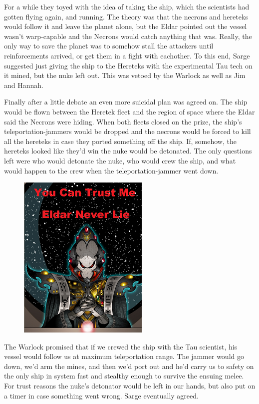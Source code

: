 For a while they toyed with the idea of taking the ship, which the scientists had gotten flying again, and running. 
The theory was that the necrons and hereteks would follow it and leave the planet alone, but the Eldar pointed out the vessel wasn't warp-capable and the Necrons would catch anything that was. 
Really, the only way to save the planet was to somehow stall the attackers until reinforcements arrived, or get them in a fight with eachother. 
To this end, Sarge suggested just giving the ship to the Hereteks with the experimental Tau tech on it mined, but the nuke left out. 
This was vetoed by the Warlock as well as Jim and Hannah. 


Finally after a little debate an even more suicidal plan was agreed on. 
The ship would be flown between the Heretek fleet and the region of space where the Eldar said the Necrons were hiding. 
When both fleets closed on the prize, the ship's teleportation-jammers would be dropped and the necrons would be forced to kill all the hereteks in case they ported something off the ship. 
If, somehow, the hereteks looked like they'd win the nuke would be detonated. 
The only questions left were who would detonate the nuke, who would crew the ship, and what would happen to the crew when the teleportation-jammer went down.

\begin{figure}
	\begin{center}
		\includegraphics[width=\figwidth]{pics/11/85.png}
	\end{center}
\end{figure}
The Warlock promised that if we crewed the ship with the Tau scientist, his vessel would follow us at maximum teleportation range. 
The jammer would go down, we'd arm the mines, and then we'd port out and he'd carry us to safety on the only ship in system fast and stealthy enough to survive the ensuing melee. 
For trust reasons the nuke's detonator would be left in our hands, but also put on a timer in case something went wrong. 
Sarge eventually agreed.

